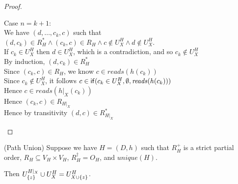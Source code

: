 \begin{proof}
\begin{tabbedproof}
\ooo Case $n = k+1$: \\
\oooo We have $(d, \ldots, c_k, c)$ such that $(d,c_k) \in R^*_H \land (c_k,c) \in R_H \land c \not\in U^H_X \land d \not\in U^H_X$. \\
\oooo If $c_k \in U^H_X$ then $d \in U^H_X$, which is a contradiction, and so $c_k \not\in U^H_X$ \\
\oooo By induction, $(d,   c_k) \in R^*_H$ \\
\oooo Since $(c_k,c) \in R_H$, we know $c \in \mathit{reads}(h(c_k))$ \\ 
\oooo Since $c_k \not\in U^H_X$, it follows $c \in \mathsf{if}({c_k \in U^H_X}, {\emptyset}, {\mathit{reads}(h(c_k))})$ \\
\oooo Hence $c \in \mathit{reads }(h|_X(c_k))$ \\
\oooo Hence $(c_k,c) \in R_{H|_X}$ \\
\oooo Hence by transitivity $(d, c) \in R^*_{H|_X}$ \\ 
\end{tabbedproof}
\end{proof}

\begin{lemma}{(Path Union)}
Suppose we have $H = (D,h)$ such that $R^+_H$ is a strict partial
order, $R_H \subseteq V_H \times V_H$, $R^\dagger_H = O_H$, and
$\mathit{unique}(H)$. 

Then $U^{H|_X}_{\{{z}\}} \cup U^H_X = U^H_{X \cup \{{z}\}}$.

\end{lemma}


